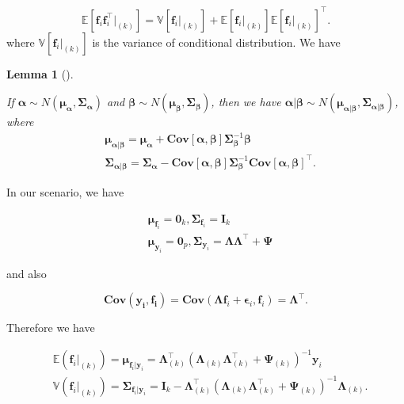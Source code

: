 \documentclass[
  a4paper,
  oneside,
  openany,
  12pt,
  onecolumn]{book}
\theoremstyle{plain}
\newtheorem{lemma}{Lemma}[chapter]
\theoremstyle{remark}
\begin{document}
\[
\mathbb{E}[\boldsymbol{f}_i\boldsymbol{f}_i^\top|_{(k)}]= \mathbb{V}[\boldsymbol{f}_i|_{(k)}]+ \mathbb{E}[\boldsymbol{f}_i|_{(k)}]\mathbb{E}[\boldsymbol{f}_i|_{(k)}]^\top.
\] where \(\mathbb{V}[\boldsymbol{f}_i|_{(k)}]\) is the variance of
conditional distribution. We have

\begin{lemma}[]\protect\hypertarget{lem-1}{}\label{lem-1}

If
\(\boldsymbol{\alpha}\sim N(\boldsymbol{\mu}_\boldsymbol{\alpha},\boldsymbol{\Sigma_\boldsymbol{\alpha}})\)
and
\(\boldsymbol{\beta}\sim N(\boldsymbol{\mu}_\boldsymbol{\beta},\boldsymbol{\Sigma}_\boldsymbol{\beta})\),
then we have
\(\boldsymbol{\alpha}|\boldsymbol{\beta}\sim N(\boldsymbol{\mu}_{\boldsymbol{\alpha}|\boldsymbol{\beta}},\boldsymbol{\Sigma}_{\boldsymbol{\alpha}|\boldsymbol{\beta}})\),
where \[
\begin{align*}
& \boldsymbol{\mu}_{\boldsymbol{\alpha}|\boldsymbol{\beta}}=\boldsymbol{\mu}_\boldsymbol{\alpha}+\boldsymbol{Cov}[\boldsymbol{\alpha},\boldsymbol{\beta}]\boldsymbol{\Sigma}_\boldsymbol{\beta}^{-1}\boldsymbol{\beta}\\
& \boldsymbol{\Sigma}_{\boldsymbol{\alpha}|\boldsymbol{\beta}}= \boldsymbol{\Sigma}_\boldsymbol{\alpha}-\boldsymbol{Cov}[\boldsymbol{\alpha},\boldsymbol{\beta}]\boldsymbol{\Sigma}_\boldsymbol{\beta}^{-1}\boldsymbol{Cov}[\boldsymbol{\alpha},\boldsymbol{\beta}]^\top.
\end{align*}
\]

\end{lemma}

In our scenario, we have

\[
\begin{align*}
& \boldsymbol{\mu}_{\boldsymbol{f}_i}= \boldsymbol{0}_k, \boldsymbol{\Sigma}_{\boldsymbol{f}_{i}}=\boldsymbol{I}_k\\
& \boldsymbol{\mu}_{\boldsymbol{y}_i}= \boldsymbol{0}_p, \boldsymbol{\Sigma}_{\boldsymbol{y}_i}=\boldsymbol{\Lambda}\boldsymbol{\Lambda}^\top+\boldsymbol{\Psi}
\end{align*} 
\]

and also

\[
\boldsymbol{Cov}(\boldsymbol{y_i},\boldsymbol{f_i})=\boldsymbol{Cov}(\boldsymbol{\Lambda f}_i+\boldsymbol{\epsilon}_i,\boldsymbol{f}_i)=\boldsymbol{\Lambda}^\top.
\]

Therefore we have

\[
\begin{align*}
&\mathbb{E}(\boldsymbol{f}_i|_{(k)})=\boldsymbol{\mu}_{\boldsymbol{f}_i|\boldsymbol{y}_i}=\boldsymbol{\Lambda}_{(k)}^\top(\boldsymbol{\Lambda}_{(k)}\boldsymbol{\Lambda}_{(k)}^\top+\boldsymbol{\Psi}_{(k)})^{-1}\boldsymbol{y}_i\\
&\mathbb{V}(\boldsymbol{f}_i|_{(k)})=\boldsymbol{\Sigma}_{\boldsymbol{f}_i|\boldsymbol{y}_i}=\boldsymbol{I}_k-\boldsymbol{\Lambda}_{(k)}^\top(\boldsymbol{\Lambda}_{(k)}\boldsymbol{\Lambda}_{(k)}^\top+\boldsymbol{\Psi}_{(k)})^{-1}\boldsymbol{\Lambda}_{(k)}.\\
\end{align*} 
\]
\end{document}
